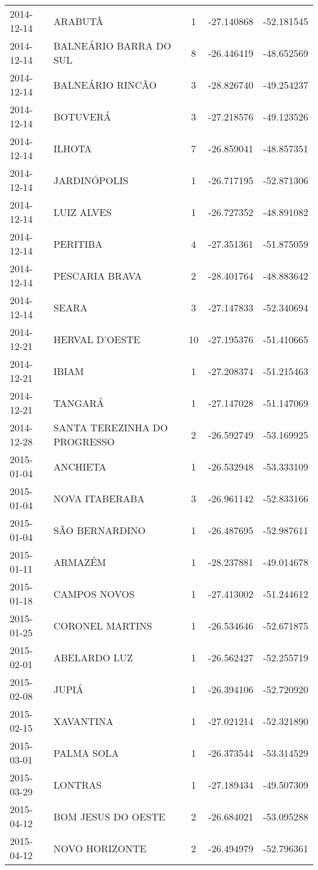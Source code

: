 \documentclass[
	12pt,				%
	openright,			%
	oneside,			%
	a4paper,			%
	english,			%
	french,				%
	spanish,			%
	brazil				%
	dvipsnames, table]{abntex2}
\begin{document}
\begin{longtable}[htbp]{llcrr}
2014-12-14 & ARABUTÃ & 1 & -27.140868 & -52.181545 \\
2014-12-14 & BALNEÁRIO BARRA DO SUL & 8 & -26.446419 & -48.652569 \\
2014-12-14 & BALNEÁRIO RINCÃO & 3 & -28.826740 & -49.254237 \\
2014-12-14 & BOTUVERÁ & 3 & -27.218576 & -49.123526 \\
2014-12-14 & ILHOTA & 7 & -26.859041 & -48.857351 \\
2014-12-14 & JARDINÓPOLIS & 1 & -26.717195 & -52.871306 \\
2014-12-14 & LUIZ ALVES & 1 & -26.727352 & -48.891082 \\
2014-12-14 & PERITIBA & 4 & -27.351361 & -51.875059 \\
2014-12-14 & PESCARIA BRAVA & 2 & -28.401764 & -48.883642 \\
2014-12-14 & SEARA & 3 & -27.147833 & -52.340694 \\
2014-12-21 & HERVAL D'OESTE & 10 & -27.195376 & -51.410665 \\
2014-12-21 & IBIAM & 1 & -27.208374 & -51.215463 \\
2014-12-21 & TANGARÁ & 1 & -27.147028 & -51.147069 \\
2014-12-28 & SANTA TEREZINHA DO PROGRESSO & 2 & -26.592749 & -53.169925 \\
2015-01-04 & ANCHIETA & 1 & -26.532948 & -53.333109 \\
2015-01-04 & NOVA ITABERABA & 3 & -26.961142 & -52.833166 \\
2015-01-04 & SÃO BERNARDINO & 1 & -26.487695 & -52.987611 \\
2015-01-11 & ARMAZÉM & 1 & -28.237881 & -49.014678 \\
2015-01-18 & CAMPOS NOVOS & 1 & -27.413002 & -51.244612 \\
2015-01-25 & CORONEL MARTINS & 1 & -26.534646 & -52.671875 \\
2015-02-01 & ABELARDO LUZ & 1 & -26.562427 & -52.255719 \\
2015-02-08 & JUPIÁ & 1 & -26.394106 & -52.720920 \\
2015-02-15 & XAVANTINA & 1 & -27.021214 & -52.321890 \\
2015-03-01 & PALMA SOLA & 1 & -26.373544 & -53.314529 \\
2015-03-29 & LONTRAS & 1 & -27.189434 & -49.507309 \\
2015-04-12 & BOM JESUS DO OESTE & 2 & -26.684021 & -53.095288 \\
2015-04-12 & NOVO HORIZONTE & 2 & -26.494979 & -52.796361 \\

\end{longtable}
\end{document}
